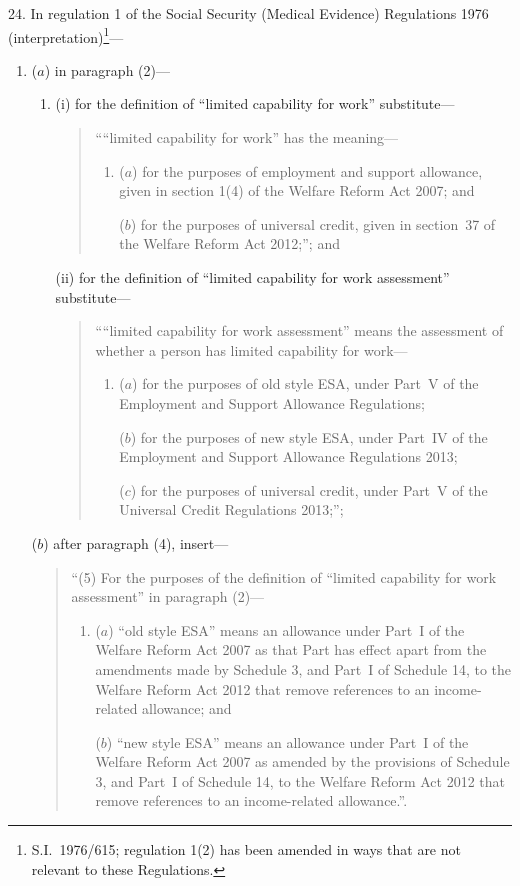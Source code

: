 \documentclass[12pt,a4paper]{article}
\begin{document}
24.  In regulation 1 of the Social Security (Medical Evidence) Regulations 1976 (interpretation)\footnote{S.I.~1976/615; regulation 1(2) has been amended in ways that are not relevant to these Regulations.}—
\begin{enumerate}\item[]
($a$) in paragraph (2)—
\begin{enumerate}\item[]
(i) for the definition of “limited capability for work” substitute—
\begin{quotation}
““limited capability for work” has the meaning—
\begin{enumerate}\item[]
($a$) 
for the purposes of employment and support allowance, given in section 1(4) of the Welfare Reform Act 2007; and

($b$) 
for the purposes of universal credit, given in section~37 of the Welfare Reform Act 2012;”; and
\end{enumerate}
\end{quotation}

(ii) for the definition of “limited capability for work assessment” substitute—
\begin{quotation}
““limited capability for work assessment” means the assessment of whether a person has limited capability for work—
\begin{enumerate}\item[]
($a$) 
for the purposes of old style ESA, under Part~V of the Employment and Support Allowance Regulations;

($b$) 
for the purposes of new style ESA, under Part~IV of the Employment and Support Allowance Regulations 2013;

($c$) 
for the purposes of universal credit, under Part~V of the Universal Credit Regulations 2013;”;
\end{enumerate}
\end{quotation}
\end{enumerate}

($b$) after paragraph (4), insert—
\begin{quotation}
“(5) For the purposes of the definition of “limited capability for work assessment” in paragraph (2)—
\begin{enumerate}\item[]
($a$) “old style ESA” means an allowance under Part~I of the Welfare Reform Act 2007 as that Part has effect apart from the amendments made by Schedule 3, and Part~I of Schedule 14, to the Welfare Reform Act 2012 that remove references to an income-related allowance; and

($b$) “new style ESA” means an allowance under Part~I of the Welfare Reform Act 2007 as amended by the provisions of Schedule 3, and Part~I of Schedule 14, to the Welfare Reform Act 2012 that remove references to an income-related allowance.”.
\end{enumerate}
\end{quotation}
\end{enumerate}
\end{document}
